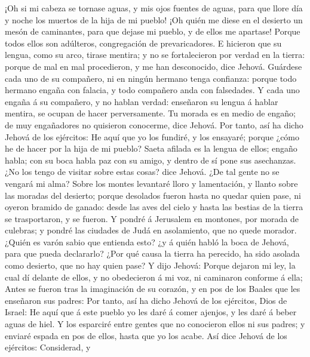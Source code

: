  ¡Oh si mi cabeza se tornase aguas, y mis ojos fuentes de
aguas, para que llore día y noche los muertos de la hija de mi pueblo!
 ¡Oh quién me diese en el desierto un mesón de caminantes,
para que dejase mi pueblo, y de ellos me apartase! Porque todos ellos
son adúlteros, congregación de prevaricadores.  E hicieron
que su lengua, como su arco, tirase mentira; y no se fortalecieron por
verdad en la tierra: porque de mal en mal procedieron, y me han
desconocido, dice Jehová.  Guárdese cada uno de su
compañero, ni en ningún hermano tenga confianza: porque todo hermano
engaña con falacia, y todo compañero anda con falsedades. 
Y cada uno engaña á su compañero, y no hablan verdad: enseñaron su
lengua á hablar mentira, se ocupan de hacer perversamente.
 Tu morada es en medio de engaño; de muy engañadores no
quisieron conocerme, dice Jehová.  Por tanto, así ha dicho
Jehová de los ejércitos: He aquí que yo los fundiré, y los ensayaré;
porque ¿cómo he de hacer por la hija de mi pueblo?  Saeta
afilada es la lengua de ellos; engaño habla; con su boca habla paz con
su amigo, y dentro de sí pone sus asechanzas.  ¿No los
tengo de visitar sobre estas cosas? dice Jehová. ¿De tal gente no se
vengará mi alma?  Sobre los montes levantaré lloro y
lamentación, y llanto sobre las moradas del desierto; porque desolados
fueron hasta no quedar quien pase, ni oyeron bramido de ganado: desde
las aves del cielo y hasta las bestias de la tierra se trasportaron, y
se fueron.  Y pondré á Jerusalem en montones, por morada
de culebras; y pondré las ciudades de Judá en asolamiento, que no quede
morador.  ¿Quién es varón sabio que entienda esto? ¿y á
quién habló la boca de Jehová, para que pueda declararlo? ¿Por qué causa
la tierra ha perecido, ha sido asolada como desierto, que no hay quien
pase?  Y dijo Jehová: Porque dejaron mi ley, la cual dí
delante de ellos, y no obedecieron á mi voz, ni caminaron conforme á
ella;  Antes se fueron tras la imaginación de su corazón,
y en pos de los Baales que les enseñaron sus padres:  Por
tanto, así ha dicho Jehová de los ejércitos, Dios de Israel: He aquí que
á este pueblo yo les daré á comer ajenjos, y les daré á beber aguas de
hiel.  Y los esparciré entre gentes que no conocieron
ellos ni sus padres; y enviaré espada en pos de ellos, hasta que yo los
acabe.  Así dice Jehová de los ejércitos: Considerad, y
